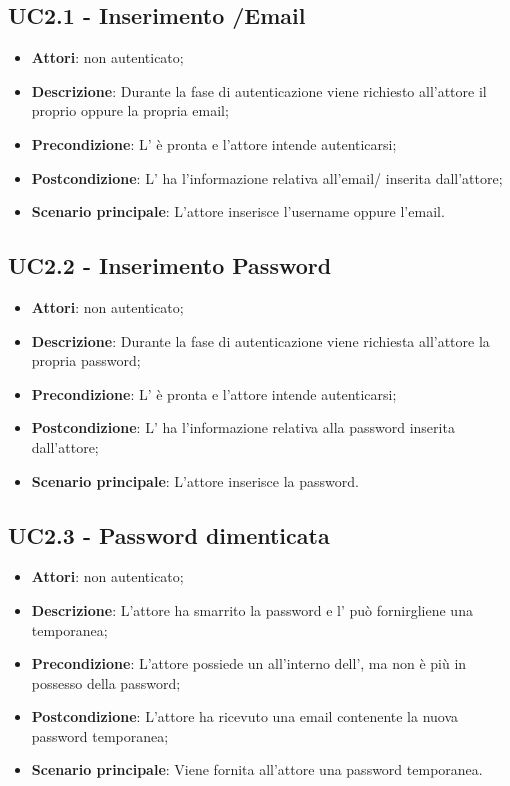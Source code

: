 \subsection{UC2.1 - Inserimento /Email}
\label{ssec:UC2.1}
\begin{itemize}
\item \textbf{Attori}:  non autenticato;
\item \textbf{Descrizione}: Durante la fase di autenticazione viene richiesto all'attore il proprio  oppure la propria email;
\item \textbf{Precondizione}: L' è pronta e l'attore intende autenticarsi;
\item \textbf{Postcondizione}: L' ha l’informazione relativa all'email/ inserita dall’attore;
\item \textbf{Scenario principale}: L'attore inserisce l'username oppure l'email.
\end{itemize}
\subsection{UC2.2 - Inserimento Password}
\label{ssec:UC2.2}
\begin{itemize}
\item \textbf{Attori}:  non autenticato;
\item \textbf{Descrizione}: Durante la fase di autenticazione viene richiesta all'attore la propria password;
\item \textbf{Precondizione}: L' è pronta e l'attore intende autenticarsi;
\item \textbf{Postcondizione}: L' ha l’informazione relativa alla password inserita dall’attore;
\item \textbf{Scenario principale}: L'attore inserisce la password.
\end{itemize}
\subsection{UC2.3 - Password dimenticata}
\label{ssec:UC2.3}
\begin{itemize}
\item \textbf{Attori}:  non autenticato;
\item \textbf{Descrizione}: L'attore ha smarrito la password e l' può fornirgliene una temporanea;
\item \textbf{Precondizione}: L'attore possiede un  all'interno dell', ma non è più in possesso della password;
\item \textbf{Postcondizione}: L'attore ha ricevuto una email contenente la nuova password temporanea;
\item \textbf{Scenario principale}: Viene fornita all'attore una password temporanea.
\end{itemize}
